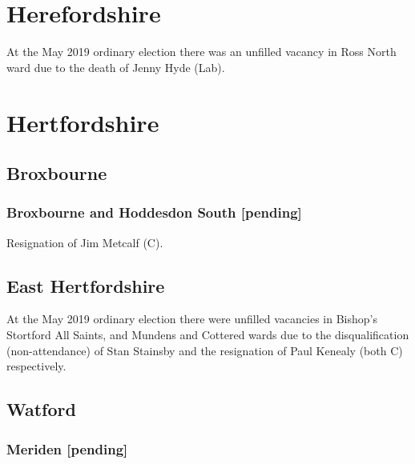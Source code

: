 \documentclass[a4paper,openany]{book}
\begin{document}
\begin{resultsiii}
\section{Herefordshire}

At the May 2019 ordinary election there was an unfilled vacancy in Ross North ward due to the death of Jenny Hyde (Lab).

\section{Hertfordshire}

\subsection*{Broxbourne}

\subsubsection*{Broxbourne and Hoddesdon South \hspace*{\fill}\nolinebreak[1]%
	\enspace\hspace*{\fill}
	[pending]}


Resignation of Jim Metcalf (C).

\subsection*{East Hertfordshire}

At the May 2019 ordinary election there were unfilled vacancies in Bishop's Stortford All Saints, and Mundens and Cottered wards due to the disqualification (non-attendance) of Stan Stainsby and the resignation of Paul Kenealy (both C) respectively.

\subsection*{Watford}

\subsubsection*{Meriden \hspace*{\fill}\nolinebreak[1]%
	\enspace\hspace*{\fill}
	[pending]}


\end{resultsiii}
\end{document}
